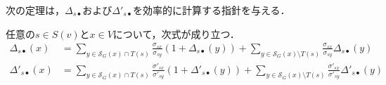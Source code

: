 次の定理は，$\Delta_{s\bullet}$および$\Delta'_{s\bullet}$を効率的に計算する指針を与える．
\begin{theorem}
  任意の$s\in S(v)$と$x\in V$について，次式が成り立つ．
  \begin{align}
    \Delta_{s\bullet}(x)
    &=\sum_{y\in\mathcal{S}_G(x)\cap T(s)}\frac{\sigma_{sx}}{\sigma_{sy}}(1+\Delta_{s\bullet}(y))
    +\sum_{y\in\mathcal{S}_G(x)\setminus T(s)}\frac{\sigma_{sx}}{\sigma_{sy}}\Delta_{s\bullet}(y)
    \label{eq:delta-dependency-1} \\
    \Delta'_{s\bullet}(x)
    &=\sum_{y\in\mathcal{S}_G(x)\cap T(s)}\frac{\sigma'_{sx}}{\sigma'_{sy}}(1+\Delta'_{s\bullet}(y))
    +\sum_{y\in\mathcal{S}_G(x)\setminus T(s)}\frac{\sigma'_{sx}}{\sigma'_{sy}}\Delta'_{s\bullet}(y)
    \label{eq:delta-dependency-2}
  \end{align}
\end{theorem}
